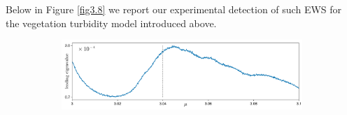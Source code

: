 \documentclass[../main.tex]{subfiles}
\begin{document}
Below in Figure \ref{fig3.8} we report our experimental detection of such EWS for the vegetation turbidity model introduced above.
\begin{figure}[H]
    \centering 
    \begin{subfigure}[b]{\textwidth}
        \centering 
        \includegraphics[keepaspectratio, width = \linewidth]{../figures/fig3.8.1.png}
    \end{subfigure}



\end{figure}
\end{document}
